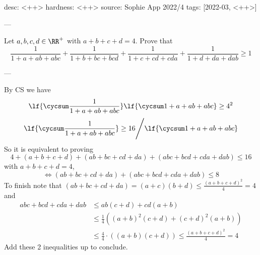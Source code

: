desc: <++>
hardness: <++>
source: Sophie App 2022/4
tags: [2022-03, <++>]

---

Let $a,b,c,d \in \RR^{+}$ with $a+b+c+d = 4$. Prove that
\[\frac 1{1+a+ab+abc} + \frac 1{1+b+bc+bcd} + \frac 1{1+c+cd+cda} + \frac 1{1+d+da+dab} \geq 1\]

---

By CS we have
$$\lf{\cycsum \frac{1}{1+a+ab+abc}}\lf{\cycsum 1+a+ab+abc} \geq 4^2$$
$$\lf{\cycsum \frac{1}{1+a+ab+abc}} \geq 16 \Bigg/\lf{\cycsum 1+a+ab+abc}$$
So it is equivalent to proving 
$$4+(a+b+c+d)+(ab+bc+cd+da)+(abc+bcd+cda+dab) \leq 16$$ with $a+b+c+d=4$, 
$$\iff (ab+bc+cd+da)+(abc+bcd+cda+dab) \leq 8$$
To finish note that 
$(ab+bc+cd+da) = (a+c)(b+d) \leq \frac{(a+b+c+d)^2}{4} = 4$ 
and
\begin{align*}
  abc+bcd+cda+dab &\leq ab(c+d) + cd(a+b) \\
  &\leq \frac{1}{4} \left((a+b)^2(c+d) + (c+d)^2(a+b)\right) \\
  &\leq \frac{4}{4} \cdot \left((a+b)(c+d)\right) \leq \frac{(a+b+c+d)^2}{4} = 4
\end{align*}
Add these 2 inequalities up to conclude. 
